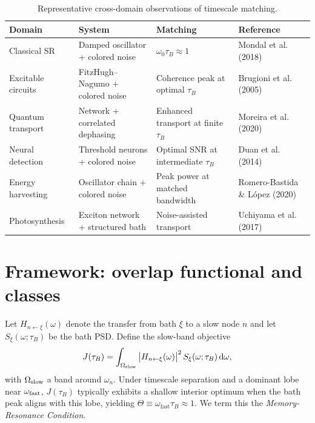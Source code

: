 \documentclass[11pt,letterpaper]{article}
\begin{document}
\begin{table}[h!]
\centering
\caption{Representative cross-domain observations of timescale matching.}
\label{tab:crossdomain}
\begin{tabularx}{\linewidth}{@{}lYYl@{}}
\toprule
Domain & System & Matching & Reference \\
\midrule
Classical SR & Damped oscillator + colored noise & $\omega_0 \tau_B \approx 1$ & Mondal et al. (2018) \cite{Mondal2018} \\
Excitable circuits & FitzHugh--Nagumo + colored noise & Coherence peak at optimal $\tau_B$ & Brugioni et al. (2005) \cite{Brugioni2005} \\
Quantum transport & Network + correlated dephasing & Enhanced transport at finite $\tau_B$ & Moreira et al. (2020) \cite{Moreira2020} \\
Neural detection & Threshold neurons + colored noise & Optimal SNR at intermediate $\tau_B$ & Duan et al. (2014) \cite{Duan2014} \\
Energy harvesting & Oscillator chain + colored noise & Peak power at matched bandwidth & Romero-Bastida \& L\'opez (2020) \cite{RomeroBastida2020} \\
Photosynthesis & Exciton network + structured bath & Noise-assisted transport & Uchiyama et al. (2017) \cite{Uchiyama2017} \\
\bottomrule
\end{tabularx}
\end{table}

\section{Framework: overlap functional and classes}
Let $H_{n\leftarrow\xi}(\omega)$ denote the transfer from bath $\xi$ to a slow node $n$ and let $S_\xi(\omega;\tau_B)$ be the bath PSD. Define the slow-band objective
\begin{equation}
J(\tau_B) = \int_{\Omega_{\rm slow}} \big|H_{n\leftarrow\xi}(\omega)\big|^2\, S_\xi(\omega;\tau_B)\, \mathrm{d}\omega,
\end{equation}
with $\Omega_{\rm slow}$ a band around $\omega_n$. Under timescale separation and a dominant lobe near $\omega_{\rm fast}$, $J(\tau_B)$ typically exhibits a shallow interior optimum when the bath peak aligns with this lobe, yielding $\Theta \equiv \omega_{\mathrm{fast}} \tau_B \approx 1$. We term this the \emph{Memory-Resonance Condition}.
\end{document}
